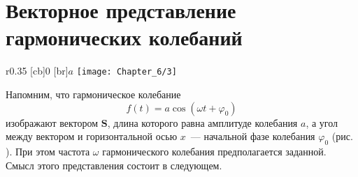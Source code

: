 






\section{Векторное представление гармонических колебаний}

\begin{wrapfigure}[]{r}{0.35\textwidth}
	[cb]{0}
	[br]{$a$}
	\texttt{[image: Chapter\_6/3]}
	\caption{}
\end{wrapfigure}

Напомним, что гармоническое колебание
\begin{equation*}
	f(t)=a\cos(\omega t+\varphi_0)
\end{equation*}
изображают вектором $\mathbf{S}$, длина которого равна амплитуде колебания $a$, а угол между вектором и горизонтальной осью
$x$~--- начальной фазе колебания $\varphi_0$ (рис. ). При этом частота $\omega$ гармонического колебания предполагается
заданной. Смысл этого представления состоит в следующем.

